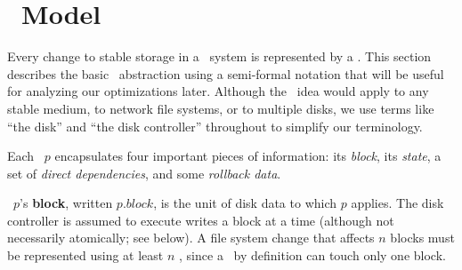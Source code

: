 
\section{\Patch\ Model}
\label{sec:patch}

\makeatletter
\let\emptyset\varnothing
\newcommand{\PState}[1]{\ensuremath{#1.\textit{state}}}
\newcommand{\PBlock}[1]{\ensuremath{#1.\textit{block}}}
\newcommand{\PMemst}{\ensuremath{\textit{mem}}}
\newcommand{\PInfst}{\ensuremath{\textit{flight}}}
\newcommand{\PDiskst}{\ensuremath{\textit{disk}}}
\newcommand{\PSetlim}[1]{\def\@next{#1}\ifx\@next\@empty\else[\@next]\fi}
\newcommand{\PMem}[1][]{\ensuremath{\textit{Mem}\PSetlim{#1}}}
\newcommand{\PInf}[1][]{\ensuremath{\textit{Flight}\PSetlim{#1}}}
\newcommand{\PDisk}[1][]{\ensuremath{\textit{Disk}\PSetlim{#1}}}
\newcommand{\PHard}[1][]{\ensuremath{\textit{\Nrb}\PSetlim{#1}}}
\newcommand{\PSoft}[1][]{\ensuremath{\textit{\Rb}\PSetlim{#1}}}
\newcommand{\PEmpty}[1][]{\ensuremath{\textit{\Noop}\PSetlim{#1}}}
\newcommand{\PDDepset}[1]{\ensuremath{\def\@next{#1}\ifx\@next\@empty\else\@next.\fi\textit{ddeps}}}
\newcommand{\PDepend}{\ensuremath{\leadsto}}
\newcommand{\PDDepend}{\ensuremath{\rightarrow}}
\newcommand{\PDepset}[1]{\ensuremath{\textit{Dep}[#1]}}
\newcommand{\PRDepset}[1]{\ensuremath{\textit{RDep}[#1]}}
\makeatother

Every change to stable storage in a \Kudos\ system is represented by a
\emph{\patch}.
%
This section describes the basic \patch\ abstraction using a semi-formal
notation that will be useful for analyzing our optimizations later.
%
Although the \patch\ idea would apply to any stable medium, to network file
systems, or to multiple disks, we use terms like ``the disk'' and ``the
disk controller'' throughout to simplify our terminology.


Each \patch\ $p$ encapsulates four important pieces of information: its
 \emph{block}, its \emph{state}, a set of \emph{direct dependencies}, and
 some \emph{rollback data}.

\Patch\ $p$'s \textbf{block}, written $\PBlock{p}$, is the unit of disk data
 to which $p$ applies.  The disk controller is assumed to execute writes a
 block at a time (although not necessarily atomically; see below).  A file system
 change that affects $n$ blocks must be represented using at least $n$
 \patches, since a \patch\ by definition can touch only one block.

